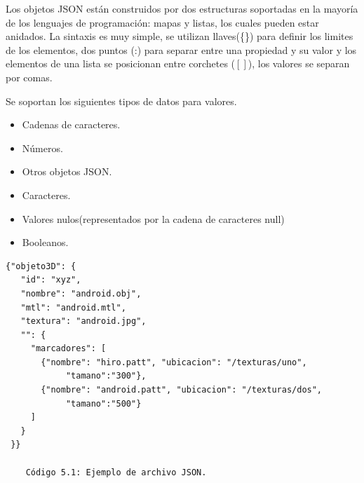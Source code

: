 \documentclass[12pt,a4paper,spanish,openany]{book}
\begin{document}
Los objetos JSON están construidos por dos estructuras soportadas en la mayoría
de los lenguajes de programación: mapas y listas, los cuales pueden estar
anidados. La sintaxis es muy simple, se utilizan llaves(\{\}) para definir los
limites de los elementos, dos puntos (:) para separar entre una propiedad y su
valor y los elementos de una lista se posicionan entre corchetes ($[]$), los
valores se separan por comas.

Se soportan los siguientes tipos de datos para valores.
\begin{itemize}
  \item Cadenas de caracteres.
  \item Números.
  \item Otros objetos JSON.
  \item Caracteres.
  \item Valores nulos(representados por la cadena de caracteres null)
  \item Booleanos.
\end{itemize}



\begin{verbatim}
{"objeto3D": {
   "id": "xyz",
   "nombre": "android.obj",
   "mtl": "android.mtl",
   "textura": "android.jpg",
   "": {
     "marcadores": [
       {"nombre": "hiro.patt", "ubicacion": "/texturas/uno", 
            "tamano":"300"},
       {"nombre": "android.patt", "ubicacion": "/texturas/dos", 
            "tamano":"500"}
     ]
   }
 }}
 
    Código 5.1: Ejemplo de archivo JSON.
\end{verbatim}
\end{document}
